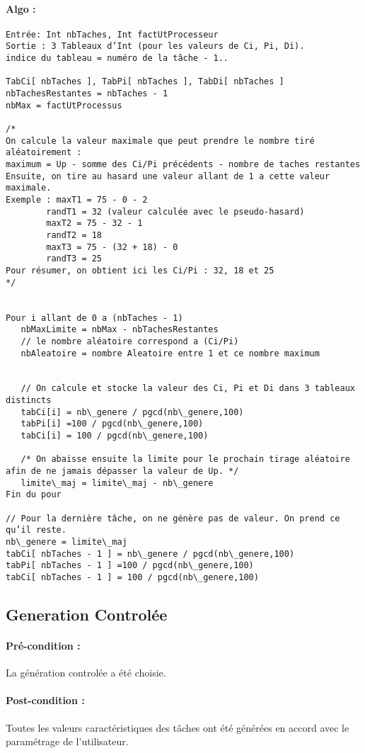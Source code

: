 		\paragraph{Algo :}
			\begin{verbatim}
Entrée: Int nbTaches, Int factUtProcesseur
Sortie : 3 Tableaux d’Int (pour les valeurs de Ci, Pi, Di). 
indice du tableau = numéro de la tâche - 1..

TabCi[ nbTaches ], TabPi[ nbTaches ], TabDi[ nbTaches ]
nbTachesRestantes = nbTaches - 1
nbMax = factUtProcessus 

/*
On calcule la valeur maximale que peut prendre le nombre tiré aléatoirement :
maximum = Up - somme des Ci/Pi précédents - nombre de taches restantes
Ensuite, on tire au hasard une valeur allant de 1 a cette valeur maximale.
Exemple : maxT1 = 75 - 0 - 2
	    randT1 = 32 (valeur calculée avec le pseudo-hasard)
	    maxT2 = 75 - 32 - 1
	    randT2 = 18
	    maxT3 = 75 - (32 + 18) - 0
	    randT3 = 25
Pour résumer, on obtient ici les Ci/Pi : 32, 18 et 25
*/


Pour i allant de 0 a (nbTaches - 1)
   nbMaxLimite = nbMax - nbTachesRestantes
   // le nombre aléatoire correspond a (Ci/Pi)
   nbAleatoire = nombre Aleatoire entre 1 et ce nombre maximum


   // On calcule et stocke la valeur des Ci, Pi et Di dans 3 tableaux distincts
   tabCi[i] = nb\_genere / pgcd(nb\_genere,100)
   tabPi[i] =100 / pgcd(nb\_genere,100)
   tabCi[i] = 100 / pgcd(nb\_genere,100)
	        
   /* On abaisse ensuite la limite pour le prochain tirage aléatoire afin de ne jamais dépasser la valeur de Up. */
   limite\_maj = limite\_maj - nb\_genere
Fin du pour

// Pour la dernière tâche, on ne génère pas de valeur. On prend ce qu’il reste.
nb\_genere = limite\_maj
tabCi[ nbTaches - 1 ] = nb\_genere / pgcd(nb\_genere,100)
tabPi[ nbTaches - 1 ] =100 / pgcd(nb\_genere,100)
tabCi[ nbTaches - 1 ] = 100 / pgcd(nb\_genere,100)
			\end{verbatim}

	\subsection{Generation Controlée}  
		\paragraph{Pré-condition :} La génération controlée a été choisie.
		\paragraph{Post-condition :} Toutes les valeurs caractéristiques des tâches ont été générées en accord avec le paramétrage de l’utilisateur.
